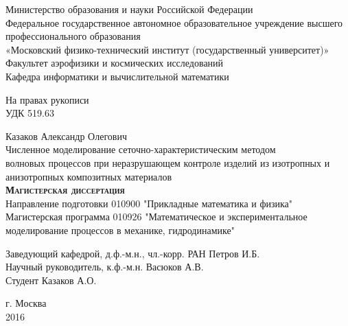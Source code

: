 \begin{titlepage}
\newpage

\begin{center}
	\small{Министерство образования и науки Российской Федерации} \\
	\small{Федеральное государственное автономное образовательное учреждение высшего профессионального образования} \\
	«Московский физико-технический институт (государственный университет)»\\
	Факультет аэрофизики и космических исследований\\
	Кафедра информатики и вычислительной математики\\
\end{center}

\vspace{1em}

\begin{flushright}
На правах рукописи \\
УДК 519.63
\end{flushright}

\begin{center}
	Казаков Александр Олегович\\[1cm]
	Численное моделирование сеточно-характеристическим методом\\
	 волновых процессов при неразрушающем контроле изделий
	 из изотропных и анизотропных композитных материалов\\[1cm]
	 \textsc{\textbf{Магистерская диссертация}} \\[1cm]
	 Направление подготовки 010900 "Прикладные математика и физика" \\
	 Магистерская программа 010926 "Математическое и экспериментальное моделирование процессов в механике, гидродинамике" \\
\end{center}

\vspace{4em}


\begin{small}
\begin{flushleft}
	Заведующий кафедрой, д.ф.-м.н., чл.-корр. РАН Петров И.Б. \hrulefill \\[0.5cm]
	Научный руководитель, к.ф.-м.н. Васюков А.В. \hrulefill \\[0.5cm]
	Студент Казаков А.О. \hrulefill \\[0.5cm]
\end{flushleft}
\end{small}


\vfill

\begin{center}
	г. Москва\\
	2016
\end{center}


\end{titlepage}
